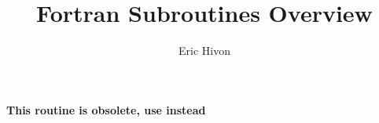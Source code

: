 
\sloppy


\title{\healpix Fortran Subroutines Overview}
 \section[getdisc\_ring]{ }
\label{sub:getdisc_ring}
\author{Eric Hivon}

\begin{facility}
{ %
{\bf This routine is obsolete, use  instead} }
{\modPixTools}
\end{facility}




